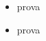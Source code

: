 \documentclass{book}
\begin{document}
	\begin{itemize}
		\item prova
		\item prova
	\end{itemize}
\end{document}
